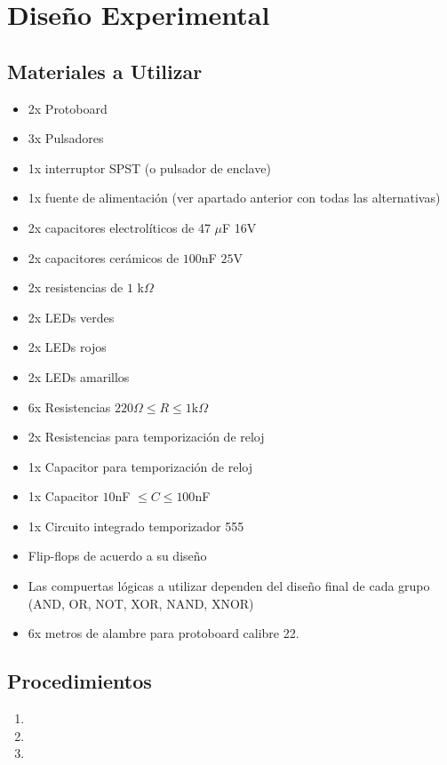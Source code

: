 \documentclass[conference]{IEEEtran}
\begin{document}
    
\section{Diseño Experimental}
    \subsection{Materiales a Utilizar}
        \begin{itemize}
        \item 2x Protoboard
    	\item 3x Pulsadores
    	\item 1x interruptor SPST (o pulsador de enclave)
    	\item 1x fuente de alimentación (ver apartado anterior con todas las alternativas)
    	\item 2x capacitores electrolíticos de 47 $\mu$F 16V
        \item 2x capacitores cerámicos de $100$nF $25$V
        \item 2x resistencias de $1$ k$\Omega$
        \item 2x LEDs verdes
        \item 2x LEDs rojos
        \item 2x LEDs amarillos
        \item 6x Resistencias $220\Omega \leq R \leq 1$k$\Omega$
        \item 2x Resistencias para temporización de reloj
    	\item 1x Capacitor para temporización de reloj
        \item 1x Capacitor $10$nF $\leq C \leq 100$nF
        \item 1x Circuito integrado temporizador 555
        \item Flip-flops de acuerdo a su diseño
        \item Las compuertas lógicas a utilizar dependen del diseño final de cada grupo (AND, OR, NOT, XOR, NAND, XNOR)
        \item 6x metros de alambre para protoboard calibre 22.
    \end{itemize}

    \subsection{Procedimientos}
        \begin{enumerate}
            \item 
            \item 
            \item 
        \end{enumerate}
\end{document}
